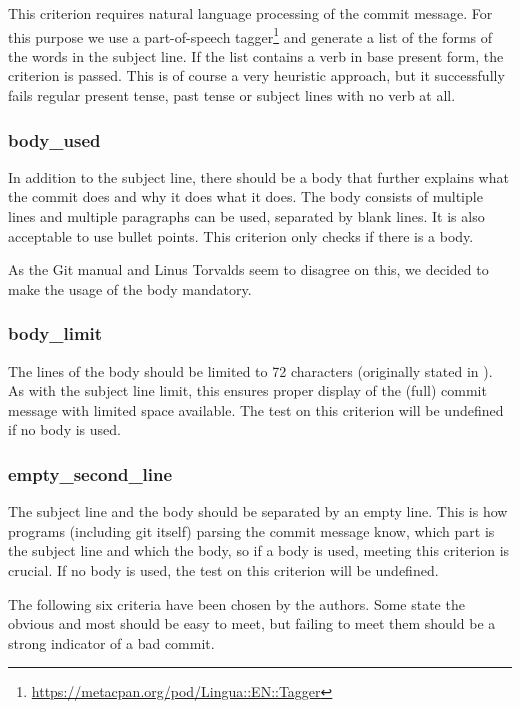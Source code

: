 This criterion requires natural language processing of the commit message. For this purpose we use a part-of-speech tagger\footnote{\url{https://metacpan.org/pod/Lingua::EN::Tagger}} and generate a list of the forms of the words in the subject line. If the list contains a verb in base present form, the criterion is passed. This is of course a very heuristic approach, but it successfully fails regular present tense, past tense or subject lines with no verb at all.

\subsubsection{body\_used}
\label{subs:body_used}
In addition to the subject line, there should be a body that further explains what the commit does and why it does what it does\cite{OffGuide}. The body consists of multiple lines and multiple paragraphs can be used, separated by blank lines. It is also acceptable to use bullet points. This criterion only checks if there is a body.

As the Git manual \cite{OffGuide} and Linus Torvalds \cite{SR} seem to disagree on this, we decided to make the usage of the body mandatory.

\subsubsection{body\_limit}
\label{subs:body_limit}
The lines of the body should be limited to 72 characters (originally stated in \cite{TP}). As with the subject line limit, this ensures proper display of the (full) commit message with limited space available. The test on this criterion will be undefined if no body is used.

\subsubsection{empty\_second\_line}
\label{subs:empty_second_line}
The subject line and the body should be separated by an empty line\cite{TP}. This is how programs (including git itself) parsing the commit message know, which part is the subject line and which the body, so if a body is used, meeting this criterion is crucial. If no body is used, the test on this criterion will be undefined.

\par\bigskip
The following six criteria have been chosen by the authors. Some state the obvious and most should be easy to meet, but failing to meet them should be a strong indicator of a bad commit.


